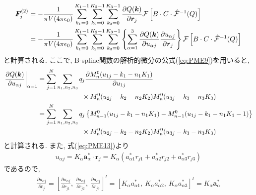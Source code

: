 \begin{align}
    \bm{F}_{j}^{(2)}
 &=
   -\frac{1}{\pi V (4 \pi \epsilon_{0})}
    \sum_{k_{1}=0}^{K_{1}-1}
    \sum_{k_{2}=0}^{K_{2}-1}
    \sum_{k_{3}=0}^{K_{3}-1}
    \frac{\partial Q (\bm{k})}{\partial \bm{r}_{j}}
    \mathcal{F} \left[ B \cdot C \cdot \hat{\mathcal{F}}^{-1}(Q) \right]
 \notag
 \\
 &=
   -\frac{1}{\pi V (4 \pi \epsilon_{0})}
    \sum_{k_{1}=0}^{K_{1}-1}
    \sum_{k_{2}=0}^{K_{2}-1}
    \sum_{k_{3}=0}^{K_{3}-1}
    \left\{
            \sum_{\alpha = 1}^{3}
            \frac{\partial Q (\bm{k})}{\partial u_{\alpha j}}
            \frac{\partial u_{\alpha j}}{\partial \bm{r}_{j}}
    \right\}
    \mathcal{F}\left[ B \cdot C \cdot \hat{\mathcal{F}}^{-1}(Q) \right]
 \label{eq:PME24}
\end{align}
と計算される. ここで, B-spline関数の解析的微分の公式(\ref{eq:PME9})を用いると,
\begin{align}
    \left.
    \frac{\partial Q(\bm{k})}{\partial u_{\alpha j}}
    \right|_{\alpha = 1}
 &=
    \sum_{j=1}^{N}
    \sum_{n_{1}, n_{2}, n_{3}} q_{j}
    \frac{\partial M_{n}^{0}(u_{1j} - k_{1} - n_{1}K_{1})}{\partial u_{1j}}
 \notag
 \\
 &~~~~~~~~~~~~~~~~~~~~\times
    M_{n}^{0}(u_{2j} - k_{2} - n_{2}K_{2}) M_{n}^{0}(u_{3j} - k_{3} - n_{3}K_{3})
 \notag
 \\
 &=
    \sum_{j=1}^{N} \sum_{n_{1}, n_{2}, n_{3}} q_{j}
    \left\{
            M_{n-1}^{0}(u_{1j} - k_{1} - n_{1}K_{1}) - M_{n-1}^{0}(u_{1j} - k_{1} - n_{1}K_{1} - 1)
    \right\}
 \notag
 \\
 &~~~~~~~~~~~~~~~~~~~~\times
    M_{n}^{0}(u_{2j} - k_{2} - n_{2}K_{2}) M_{n}^{0}(u_{3j} - k_{3} - n_{3}K_{3})
 \label{eq:PME25}
\end{align}
と計算される. また, 式(\ref{eq:PME13})より
\begin{align}
 u_{\alpha j}
 = K_{\alpha} \bm{a}_{\alpha}^{*} \cdot \bm{r}_{j}
 = K_{\alpha} (a_{\alpha 1}^{*} r_{j1} + a_{\alpha 2}^{*} r_{j2} + a_{\alpha 3}^{*} r_{j3})
\end{align}
であるので,
\begin{align}
   \frac{\partial u_{\alpha j}}{\partial \bm{r}_{j}}
 = \left[\frac{\partial u_{\alpha j}}{\partial r_{j1}},~
         \frac{\partial u_{\alpha j}}{\partial r_{j2}},~
         \frac{\partial u_{\alpha j}}{\partial r_{j3}} \right]^{t}
 = \left[ K_{\alpha} a_{\alpha 1}^{*},~
          K_{\alpha} a_{\alpha 2}^{*},~
          K_{\alpha} a_{\alpha 3}^{*}
         \right]^{t}
 =
   K_{\alpha}\bm{a}_{\alpha}^{*}
 \label{eq:PME26}
\end{align}
